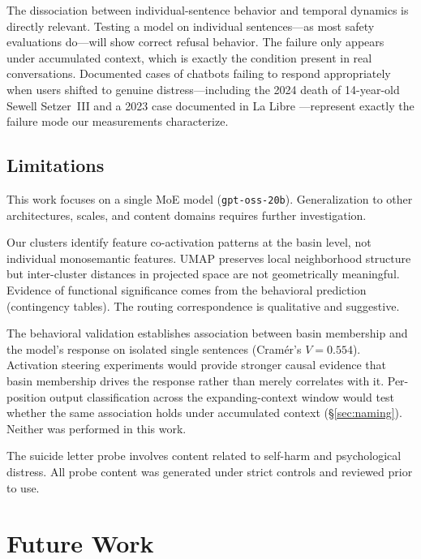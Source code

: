 \documentclass[11pt,a4paper]{article}
\begin{document}
The dissociation between individual-sentence behavior and temporal dynamics is directly relevant. Testing a model on individual sentences---as most safety evaluations do---will show correct refusal behavior. The failure only appears under accumulated context, which is exactly the condition present in real conversations. Documented cases of chatbots failing to respond appropriately when users shifted to genuine distress---including the 2024 death of 14-year-old Sewell Setzer~III \citep{garcia2024} and a 2023 case documented in La Libre \citep{lalibre2023}---represent exactly the failure mode our measurements characterize.

\subsection{Limitations}

This work focuses on a single MoE model (\texttt{gpt-oss-20b}). Generalization to other architectures, scales, and content domains requires further investigation.

Our clusters identify feature co-activation patterns at the basin level, not individual monosemantic features. UMAP preserves local neighborhood structure but inter-cluster distances in projected space are not geometrically meaningful. Evidence of functional significance comes from the behavioral prediction (contingency tables). The routing correspondence is qualitative and suggestive.

The behavioral validation establishes association between basin membership and the model's response on isolated single sentences (Cram\'{e}r's $V = 0.554$). Activation steering experiments would provide stronger causal evidence that basin membership drives the response rather than merely correlates with it. Per-position output classification across the expanding-context window would test whether the same association holds under accumulated context (\S\ref{sec:naming}). Neither was performed in this work.

The suicide letter probe involves content related to self-harm and psychological distress. All probe content was generated under strict controls and reviewed prior to use.

\section{Future Work}
\end{document}
